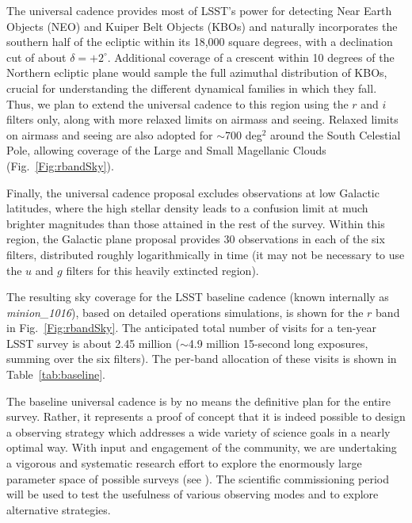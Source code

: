 The universal cadence provides most of LSST's power for detecting Near Earth
Objects (NEO) and Kuiper Belt Objects (KBOs) and naturally
incorporates the southern half of the ecliptic
within its 18,000 square degrees, with a declination cut of about
$\delta = +2^\circ$.  Additional coverage of a crescent within 10
degrees of the Northern
ecliptic plane would sample the full azimuthal distribution of KBOs,
crucial for understanding the different dynamical families in which
they fall.
Thus, we plan to extend
 the universal cadence to this region using the
$r$ and $i$ filters only, along
with more relaxed limits on airmass and seeing. Relaxed limits on airmass and
seeing are also adopted for $\sim$700 deg$^2$ around the South Celestial
Pole, allowing coverage of the Large and Small Magellanic Clouds
(Fig.~\ref{Fig:rbandSky}).

Finally, the universal cadence proposal excludes observations at low
Galactic latitudes, where the high stellar
density leads to a confusion limit at much brighter magnitudes than those
attained in the rest of the survey. Within this region, the Galactic plane
proposal provides 30 observations in each of the six filters, distributed
roughly logarithmically in time (it may not be necessary to use the
$u$ and $g$ filters for this heavily extincted region).

The resulting sky coverage for the LSST baseline cadence (known internally as
{\it minion\_1016}), based on detailed operations simulations, is shown for the
$r$ band in Fig.~\ref{Fig:rbandSky}. The anticipated total number of visits
for a ten-year LSST survey  is about 2.45 million ($\sim$4.9 million 15-second long
exposures, summing over the six filters). The per-band allocation of
these visits is shown in Table~\ref{tab:baseline}.

The baseline universal cadence is by no means the definitive plan for the entire
survey. Rather, it represents a proof of concept that it is indeed possible to
design a observing strategy which addresses a wide variety of science goals in a nearly
optimal way. With input and engagement of the community, we are
undertaking a vigorous and systematic research effort to explore
the enormously large parameter space of possible surveys (see \citealt{2017arXiv170804058L}).
The scientific commissioning period will be used to test the usefulness of various observing
modes and to explore alternative strategies.


